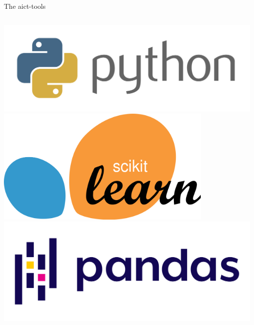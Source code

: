 \begin{frame}{The aict-tools}
\begin{columns}[onlytextwidth]
        \begin{column}{0.33\textwidth}
            \centering
            \includegraphics[width=\textwidth]{images/python.png}
            \includegraphics[width=0.8\textwidth]{images/scikit.png}
            \includegraphics[width=\textwidth]{images/pandas.png}
        \end{column}
    \end{columns}


\end{frame}
